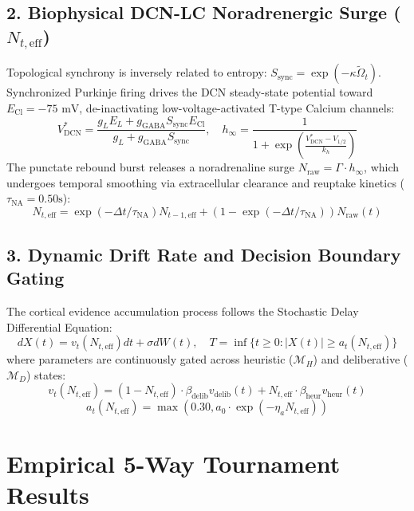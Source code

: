 \documentclass[11pt,twoside,a4paper]{article}
\begin{document}
\subsection{2. Biophysical DCN-LC Noradrenergic Surge ($N_{t,\text{eff}}$)}
Topological synchrony is inversely related to entropy: $S_{\text{sync}} = \exp(-\kappa \tilde{\Omega}_t)$. Synchronized Purkinje firing drives the DCN steady-state potential toward $E_{\text{Cl}} = -75\text{ mV}$, de-inactivating low-voltage-activated T-type Calcium channels:
\begin{equation}
V^*_{\text{DCN}} = \frac{g_L E_L + g_{\text{GABA}} S_{\text{sync}} E_{\text{Cl}}}{g_L + g_{\text{GABA}} S_{\text{sync}}}, \quad h_{\infty} = \frac{1}{1 + \exp\left(\frac{V^*_{\text{DCN}} - V_{1/2}}{k_h}\right)}
\end{equation}
The punctate rebound burst releases a noradrenaline surge $N_{\text{raw}} = \Gamma \cdot h_{\infty}$, which undergoes temporal smoothing via extracellular clearance and reuptake kinetics ($\tau_{\text{NA}} = 0.50\text{s}$):
\begin{equation}
N_{t,\text{eff}} = \exp(-\Delta t / \tau_{\text{NA}}) N_{t-1,\text{eff}} + (1 - \exp(-\Delta t / \tau_{\text{NA}})) N_{\text{raw}}(t)
\end{equation}

\subsection{3. Dynamic Drift Rate and Decision Boundary Gating}
The cortical evidence accumulation process follows the Stochastic Delay Differential Equation:
\begin{equation}
dX(t) = v_t(N_{t,\text{eff}}) dt + \sigma dW(t), \quad T = \inf \{ t \geq 0 : |X(t)| \geq a_t(N_{t,\text{eff}}) \}
\end{equation}
where parameters are continuously gated across heuristic ($\mathcal{M}_H$) and deliberative ($\mathcal{M}_D$) states:
\begin{equation}
v_t(N_{t,\text{eff}}) = (1 - N_{t,\text{eff}}) \cdot \beta_{\text{delib}} v_{\text{delib}}(t) + N_{t,\text{eff}} \cdot \beta_{\text{heur}} v_{\text{heur}}(t)
\end{equation}
\begin{equation}
a_t(N_{t,\text{eff}}) = \max\left(0.30, a_0 \cdot \exp(-\eta_a N_{t,\text{eff}})\right)
\end{equation}

\section{Empirical 5-Way Tournament Results}
\end{document}
